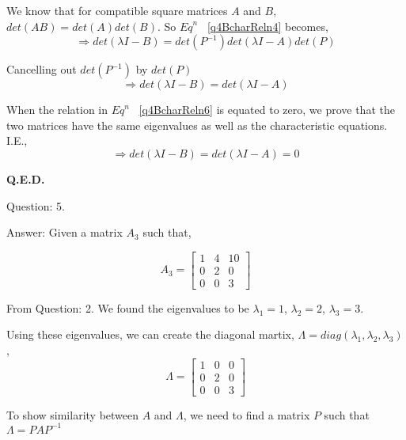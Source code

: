 \documentclass[a4paper]{article}
\begin{document}
\begin{qalist}
			We know that for compatible square matrices $A$ and $B$, $det(AB) = det(A)det(B)$. So ${Eq}^{n}$ ~\ref{q4BcharReln4} becomes, 
			\begin{equation}\label{q4BcharReln5}
				\Rightarrow  det(\lambda I - B) =  det({P}^{-1}) det(\lambda I - A) det(P) 
			\end{equation}
			
			Cancelling out $ det({P}^{-1})$ by $det(P)$
			\begin{equation}\label{q4BcharReln6}
				\Rightarrow  det(\lambda I - B) =  det(\lambda I - A)
			\end{equation}
			
			When the relation in ${Eq}^{n}$ ~\ref{q4BcharReln6} is equated to zero, we prove that the two matrices have the same eigenvalues as well as the characteristic equations. I.E.,
			\begin{equation}\label{q4BcharReln6}
				\Rightarrow  det(\lambda I - B) =  det(\lambda I - A) = 0
			\end{equation}
			
			\textbf{Q.E.D.}

		\item[Question: 5.] \setcounter{equation}{0}
		\item[Answer:] Given a matrix ${A}_{3}$ such that,
		
			\begin{equation} \label{q5Given}
				{A}_{3} = \begin{bmatrix}1 & 4 & 10 \\ 0 & 2 & 0 \\ 0 & 0 & 3\end{bmatrix}
			\end{equation}
			
			From Question: 2. We found the eigenvalues to be ${\lambda}_{1} = 1$, ${\lambda}_{2} = 2$, ${\lambda}_{3} = 3$. 
			
			Using these eigenvalues, we can create the diagonal martix, $\Lambda = diag({\lambda}_{1}, {\lambda}_{2}, {\lambda}_{3})$,
			\begin{equation}\label{q5DiagMat}
				\Lambda = \begin{bmatrix}1 & 0 & 0 \\ 0 & 2 & 0 \\ 0 & 0 & 3\end{bmatrix}
			\end{equation}
			
			To show similarity between $A$ and $\Lambda$, we need to find a matrix $P$ such that $\Lambda = P A {P}^{-1}$
			

\end{qalist}
\end{document}
